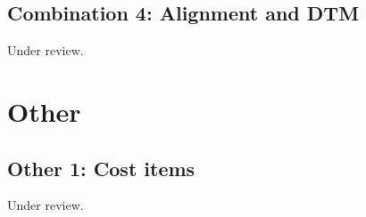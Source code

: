 \documentclass{scrartcl}
\begin{document}
\subsection{Combination 4: Alignment and DTM}
\label{sec:align_dtm_2}
Under review.%
\clearpage

\section{Other}

\subsection{Other 1: Cost items}
\label{sec:other_1}
Under review.%
\clearpage
\end{document}
